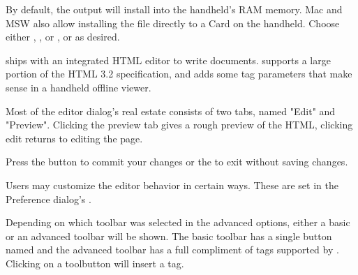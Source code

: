 By default, the output will install into the handheld's RAM memory. 
Mac and MSW also allow installing the file directly to a Card on the handheld. 
Choose either ,
, or
, or
 as desired.



\brandingapplicationdesktopname ships with an integrated HTML editor to write \brandingapplicationsuitename documents.
\brandingapplicationsuitename supports a large portion of the HTML 3.2 specification, and adds some
tag parameters that make sense in a handheld offline viewer.

Most of the editor dialog's real estate consists of two tabs, named "Edit" and 
"Preview". Clicking the preview tab gives a rough preview of the HTML, clicking
edit returns to editing the page. 


Press the  button to commit your changes or the 
 to exit without saving changes.

Users may customize the editor behavior in certain ways. These are set in the 
Preference dialog's
\helpignore{\ref{sec:pd-preferences-dialog-editor-tab}}
.

Depending on which toolbar was selected in the advanced options, either a basic
or an advanced toolbar will be shown. The basic toolbar has a single button
named  and the advanced toolbar has a
full compliment of tags supported by \brandingapplicationsuitename. Clicking on a toolbutton will
insert a tag.


